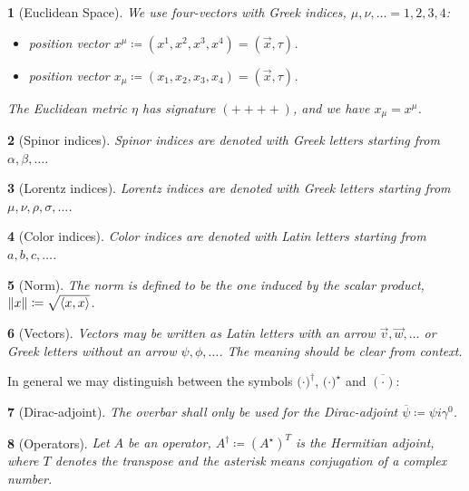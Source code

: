 \documentclass{article}
\theoremstyle{plain} %
\theoremstyle{convention} %
\newtheorem*{convention}{} %
\theoremstyle{remark} %
\numberwithin{equation}{section}
\begin{document}
\begin{convention}[Euclidean Space]
We use four-vectors with Greek indices, $\mu, \nu, \dots = 1, 2, 3, 4$:
\begin{itemize}
  \item position vector $x^{\mu} \coloneqq (x^1, x^2, x^3, x^4) = (\vec{x}, \tau)$.
  \item position vector $x_{\mu} \coloneqq (x_1, x_2, x_3, x_4) = (\vec{x}, \tau)$.
\end{itemize}

The Euclidean metric $\eta$ has signature $(++++)$, and we have $x_{\mu} = x^{\mu}$.

\end{convention}

\begin{convention}[Spinor indices]
Spinor indices are denoted with Greek letters starting from $\alpha, \beta, \dots$.
\end{convention}

\begin{convention}[Lorentz indices]
Lorentz indices are denoted with Greek letters starting from $\mu, \nu, \rho, \sigma, \dots$.
\end{convention}

\begin{convention}[Color indices]
Color indices are denoted with Latin letters starting from $a, b, c, \dots$.
\end{convention}

\begin{convention}[Norm]
The norm is defined to be the one induced by the scalar product, $\norm{x} \coloneqq \sqrt{\langle x, x \rangle}$.
\end{convention}

\begin{convention}[Vectors]
Vectors may be written as Latin letters with an arrow $\vec{v}, \vec{w}, \dots$ or Greek letters without an arrow $\psi, \phi, \dots$. The meaning should be clear from context.
\end{convention}

In general we may distinguish between the symbols ${(\cdot})^{\dagger}$, ${(\cdot})^{\star}$ and $\overline{(\cdot)}$:

\begin{convention}[Dirac-adjoint]
  The overbar shall only be used for the Dirac-adjoint $\overline{\psi} \coloneqq \psi i \gamma^0$.
\end{convention}

\begin{convention}[Operators]
  Let $A$ be an operator, $A^{\dagger} \coloneqq (A^{\star})^T$ is the Hermitian adjoint, where $T$ denotes the transpose and the asterisk means conjugation of a complex number.
\end{convention}
\end{document}
